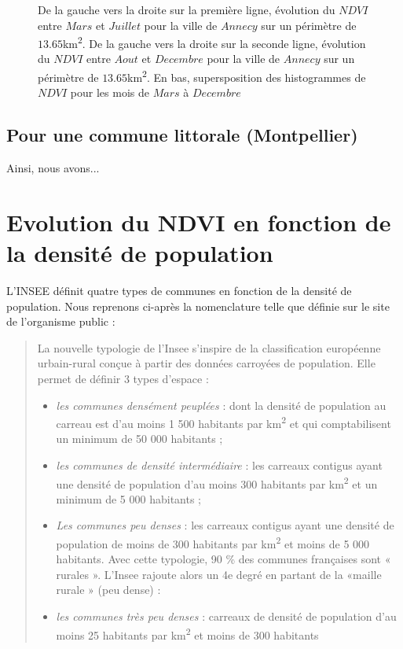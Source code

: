 \documentclass{book}
\begin{document}
\begin{figure}[H]
\begin{center}
\end{center}
\caption{De la gauche vers la droite sur la première ligne, évolution du $NDVI$ entre $Mars$ et $Juillet$ pour la ville de $Annecy$ sur un périmètre de $13.65$km\textsuperscript{2}.
De la gauche vers la droite sur la seconde ligne, évolution du $NDVI$ entre $Aout$ et $Decembre$ pour la ville de $Annecy$ sur un périmètre de $13.65$km\textsuperscript{2}. 
En bas, supersposition des histogrammes de $NDVI$ pour les mois de $Mars$ à $Decembre$}
\label{fontainebleau_ndvi_annee}
\end{figure}

\clearpage

\section{Pour une commune littorale (Montpellier)}

\clearpage

Ainsi, nous avons...

\chapter{Evolution du NDVI en fonction de la densité de population}

L'INSEE définit quatre types de communes en fonction de la densité de population. Nous reprenons ci-après la nomenclature telle que définie sur le
site de l'organisme public :\\
\begin{quotation}

\Large{
La nouvelle typologie de l’Insee s’inspire de la classification européenne urbain-rural conçue à partir des données carroyées de population. 
Elle permet de définir 3 types d’espace :\\

\begin{itemize}
\item \emph{les communes densément peuplées} : dont la densité de population au carreau est d’au moins 1 500 habitants par km\textsuperscript{2} 
et qui comptabilisent un minimum de 50 000 habitants ;

\item \emph{les communes de densité intermédiaire} : les carreaux contigus ayant une densité de population d’au moins 300 habitants par km\textsuperscript{2} 
et un minimum de 5 000 habitants ;

\item \emph{Les communes peu denses} : les carreaux contigus ayant une densité de population de moins de 300 habitants par km\textsuperscript{2} et moins de 5 000 habitants.
Avec cette typologie, 90 \% des communes françaises sont « rurales ». L’Insee rajoute alors un 4e degré en partant de la «maille rurale » (peu dense) :

\item \emph{les communes très peu denses} : carreaux de densité de population d’au moins 25 habitants par km\textsuperscript{2} et moins de 300 habitants
\end{itemize}
}

\end{quotation}
\end{document}
